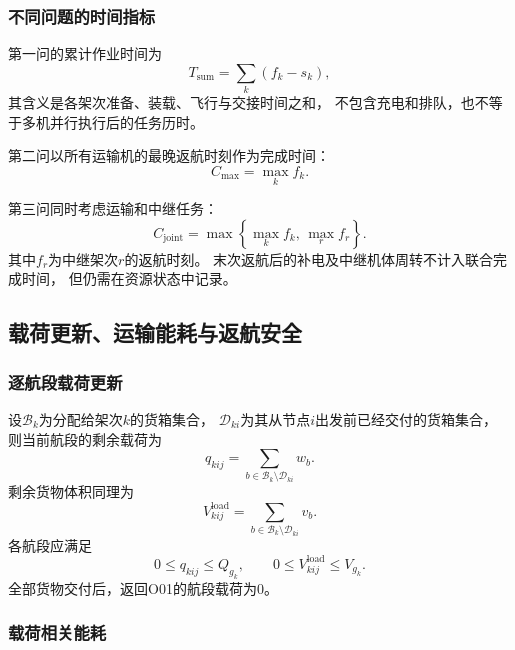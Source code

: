 \documentclass[bwprint]{gmcmthesis}
\begin{document}
\subsubsection{不同问题的时间指标}

第一问的累计作业时间为
\begin{equation}
    T_{\mathrm{sum}}
    =
    \sum_k(f_k-s_k),
\end{equation}
其含义是各架次准备、装载、飞行与交接时间之和，
不包含充电和排队，也不等于多机并行执行后的任务历时。

第二问以所有运输机的最晚返航时刻作为完成时间：
\begin{equation}
    C_{\max}
    =
    \max_k f_k.
\end{equation}

第三问同时考虑运输和中继任务：
\begin{equation}
    C_{\mathrm{joint}}
    =
    \max\left\{
    \max_k f_k,\,
    \max_r f_r
    \right\}.
\end{equation}
其中$f_r$为中继架次$r$的返航时刻。
末次返航后的补电及中继机体周转不计入联合完成时间，
但仍需在资源状态中记录。

\subsection{载荷更新、运输能耗与返航安全}

\subsubsection{逐航段载荷更新}

设$\mathcal{B}_k$为分配给架次$k$的货箱集合，
$\mathcal{D}_{ki}$为其从节点$i$出发前已经交付的货箱集合，
则当前航段的剩余载荷为
\begin{equation}
    q_{kij}
    =
    \sum_{b\in\mathcal{B}_k\setminus\mathcal{D}_{ki}}w_b.
\end{equation}
剩余货物体积同理为
\begin{equation}
    V_{kij}^{\mathrm{load}}
    =
    \sum_{b\in\mathcal{B}_k\setminus\mathcal{D}_{ki}}v_b.
\end{equation}
各航段应满足
\begin{equation}
    0\leq q_{kij}\leq Q_{g_k},
    \qquad
    0\leq V_{kij}^{\mathrm{load}}\leq V_{g_k}.
\end{equation}
全部货物交付后，返回O01的航段载荷为0。

\subsubsection{载荷相关能耗}
\end{document}
